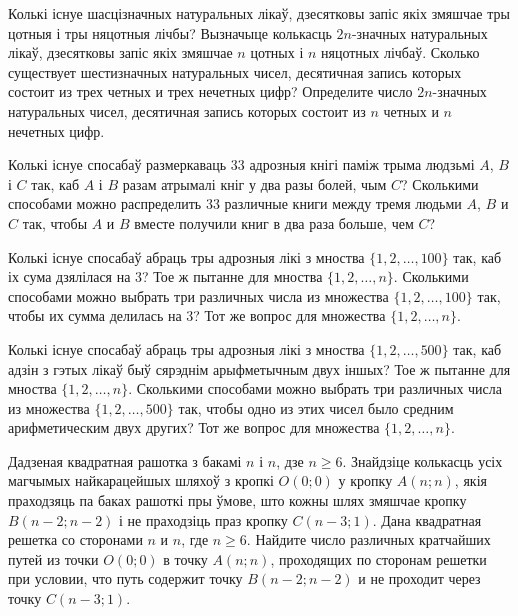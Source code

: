 \begin{problemList}
\bigskip

\problemItemSimple
{Колькі існуе шасцізначных натуральных лікаў, дзесятковы запіс якіх змяшчае тры цотныя
і тры няцотныя лічбы? Вызначыце колькасць $2n$-значных натуральных лікаў,
дзесятковы запіс якіх змяшчае $n$ цотных і $n$ няцотных лічбаў.}
{Сколько существует шестизначных натуральных чисел, десятичная запись
которых состоит из трех четных и трех нечетных цифр? Определите число
$2n$-значных натуральных чисел, десятичная запись которых
состоит из $n$ четных и $n$ нечетных цифр.}

\bigskip

\problemItemSimple
{Колькі існуе спосабаў размеркаваць 33 адрозныя кнігі паміж трыма людзьмі
$A$, $B$ і $C$ так, каб $A$ і $B$ разам атрымалі кніг у два разы болей, чым $C$?}
{Сколькими способами можно распределить 33 различные книги между тремя
людьми $A$, $B$ и $C$ так, чтобы $A$ и $B$ вместе получили книг в два
раза больше, чем $C$?}

\bigskip

\problemItemSimple
{Колькі існуе спосабаў абраць тры адрозныя лікі з мноства $\{1, 2, \ldots, 100\}$ так,
каб іх сума дзялілася на 3? Тое ж пытанне для мноства $\{1, 2, \ldots, n\}$.}
{Сколькими способами можно выбрать три различных числа из множества
$\{1, 2, \ldots, 100\}$ так, чтобы их сумма делилась на 3? Тот же
вопрос для множества $\{1, 2, \ldots, n\}$.}

\bigskip

\problemItemSimple
{Колькі існуе спосабаў абраць тры адрозныя лікі з мноства $\{1, 2, \ldots, 500\}$ так,
каб адзін з гэтых лікаў быў сярэднім арыфметычным двух іншых?
Тое ж пытанне для мноства $\{1, 2, \ldots, n\}$.}
{Сколькими способами можно выбрать три различных числа из множества
$\{1, 2, \ldots, 500\}$ так, чтобы одно из этих чисел было средним
арифметическим двух других? Тот же вопрос для множества
$\{1, 2, \ldots, n\}$.}

\bigskip

\problemItemSimple
{Дадзеная квадратная рашотка з бакамі $n$ і $n$, дзе $n \ge 6$. Знайдзіце
колькасць усіх магчымых найкарацейшых шляхоў з кропкі $O(0; 0)$ у кропку $A(n; n)$,
якія праходзяць па баках рашоткі пры ўмове, што кожны шлях змяшчае кропку
$B(n - 2; n - 2)$ і не праходзіць праз кропку $C(n - 3; 1)$.}
{Дана квадратная решетка со сторонами $n$ и $n$, где $n \ge 6$. Найдите
число различных кратчайших путей из точки $O(0; 0)$ в точку $A(n; n)$,
проходящих по сторонам решетки при условии, что путь содержит точку
$B(n - 2; n - 2)$ и не проходит через точку $C(n - 3; 1)$.}


\end{problemList}
